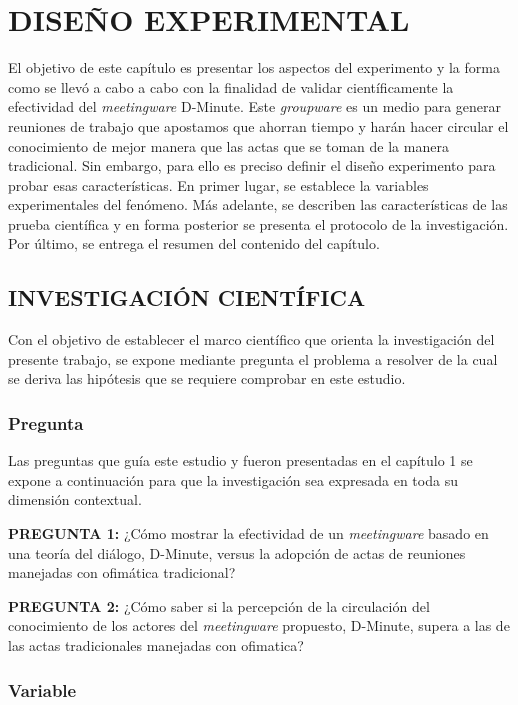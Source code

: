 \section{DISE\~NO EXPERIMENTAL}

El objetivo de este capítulo es presentar los aspectos del experimento y la forma como se llevó a cabo a cabo con la finalidad de validar científicamente la efectividad del \textit{meetingware} D-Minute. Este \textit{groupware} es un medio para generar reuniones de trabajo que apostamos que ahorran tiempo y harán hacer circular el conocimiento de mejor manera que las actas que se toman de la manera tradicional. Sin embargo, para ello es preciso definir el diseño experimento para probar esas características. En primer lugar, se establece la variables experimentales del fenómeno. Más adelante, se describen las características de las prueba científica y en forma posterior se presenta el protocolo de la investigación. Por último, se entrega el resumen del contenido del capítulo. 

\subsection{INVESTIGACIÓN CIENTÍFICA}

Con el objetivo de establecer el marco científico que orienta la investigación del presente trabajo, se expone mediante pregunta el problema a resolver de la cual se deriva las hipótesis que se requiere comprobar en este estudio.

\subsubsection{Pregunta}

Las preguntas que guía este estudio y fueron presentadas en el capítulo 1  se expone a continuación para que la investigación sea expresada en toda su dimensión contextual.\newline

\textbf{PREGUNTA 1:} ¿Cómo mostrar la efectividad de un \textit{meetingware} basado en una teoría del diálogo, D-Minute, versus la adopción de actas de reuniones manejadas con ofimática tradicional?\newline

\textbf{PREGUNTA 2:} ¿Cómo saber si la percepción de la circulación del conocimiento de los actores del \textit{meetingware} propuesto, D-Minute, supera a las de las actas tradicionales manejadas con ofimatica?

\subsubsection{Variable}

